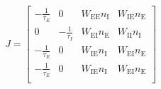 \documentclass{article} %
\begin{document}
\begin{equation*}
J = \begin{bmatrix}
-\frac{1}{\tau_{E}} & 0 & W_{\mathrm{EE}}n_{\mathrm{I}} & W_{\mathrm{IE}}n_{\mathrm{E}} \\
0 &  -\frac{1}{\tau_{I}} & W_{\mathrm{EI}}n_{\mathrm{E}} & W_{\mathrm{II}}n_{\mathrm{I}} \\
-\frac{1}{\tau_{E}} & 0 & W_{\mathrm{IE}}n_{\mathrm{I}} & W_{\mathrm{EI}}n_{\mathrm{E}} \\
-\frac{1}{\tau_{E}} & 0 & W_{\mathrm{IE}}n_{\mathrm{I}} & W_{\mathrm{EI}}n_{\mathrm{E}} \\
\end{bmatrix}
\end{equation*}
\end{document}
